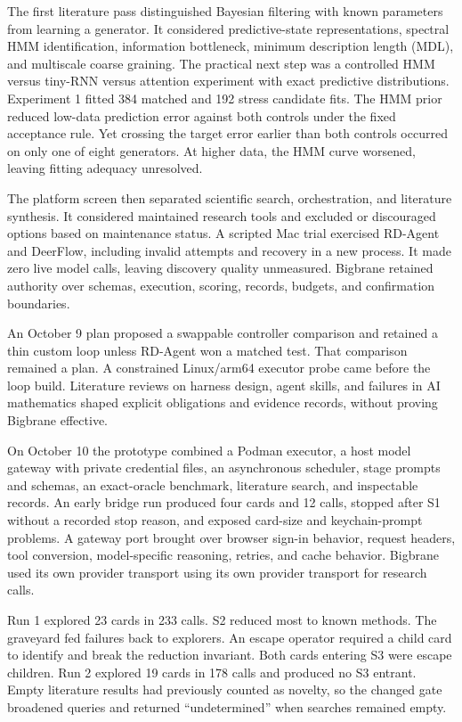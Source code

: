 The first literature pass distinguished Bayesian filtering with known parameters from learning a generator. It considered predictive-state representations, spectral HMM identification, information bottleneck, minimum description length (MDL), and multiscale coarse graining. The practical next step was a controlled HMM versus tiny-RNN versus attention experiment with exact predictive distributions. Experiment 1 fitted 384 matched and 192 stress candidate fits. The HMM prior reduced low-data prediction error against both controls under the fixed acceptance rule. Yet crossing the target error earlier than both controls occurred on only one of eight generators. At higher data, the HMM curve worsened, leaving fitting adequacy unresolved.

The platform screen then separated scientific search, orchestration, and literature synthesis. It considered maintained research tools and excluded or discouraged options based on maintenance status. A scripted Mac trial exercised RD-Agent and DeerFlow, including invalid attempts and recovery in a new process. It made zero live model calls, leaving discovery quality unmeasured. Bigbrane retained authority over schemas, execution, scoring, records, budgets, and confirmation boundaries.

An October 9 plan proposed a swappable controller comparison and retained a thin custom loop unless RD-Agent won a matched test. That comparison remained a plan. A constrained Linux/arm64 executor probe came before the loop build. Literature reviews on harness design, agent skills, and failures in AI mathematics shaped explicit obligations and evidence records, without proving Bigbrane effective.

On October 10 the prototype combined a Podman executor, a host model gateway with private credential files, an asynchronous scheduler, stage prompts and schemas, an exact-oracle benchmark, literature search, and inspectable records. An early bridge run produced four cards and 12 calls, stopped after S1 without a recorded stop reason, and exposed card-size and keychain-prompt problems. A gateway port brought over browser sign-in behavior, request headers, tool conversion, model-specific reasoning, retries, and cache behavior. Bigbrane used its own provider transport using its own provider transport for research calls.

Run 1 explored 23 cards in 233 calls. S2 reduced most to known methods. The graveyard fed failures back to explorers. An escape operator required a child card to identify and break the reduction invariant. Both cards entering S3 were escape children. Run 2 explored 19 cards in 178 calls and produced no S3 entrant. Empty literature results had previously counted as novelty, so the changed gate broadened queries and returned ``undetermined'' when searches remained empty.


